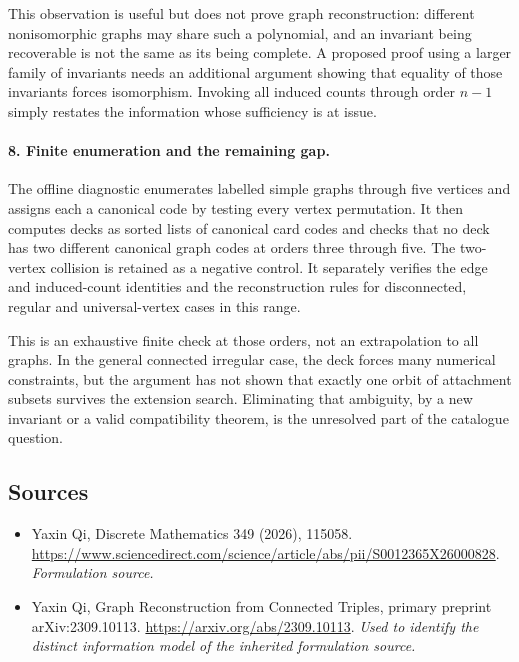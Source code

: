 \documentclass[11pt]{article}
\begin{document}
This observation is useful but does not prove graph reconstruction: different nonisomorphic graphs may share such a polynomial, and an invariant being recoverable is not the same as its being complete. A proposed proof using a larger family of invariants needs an additional argument showing that equality of those invariants forces isomorphism. Invoking all induced counts through order $n-1$ simply restates the information whose sufficiency is at issue.

\paragraph{8. Finite enumeration and the remaining gap.}
The offline diagnostic enumerates labelled simple graphs through five vertices and assigns each a canonical code by testing every vertex permutation. It then computes decks as sorted lists of canonical card codes and checks that no deck has two different canonical graph codes at orders three through five. The two-vertex collision is retained as a negative control. It separately verifies the edge and induced-count identities and the reconstruction rules for disconnected, regular and universal-vertex cases in this range.

This is an exhaustive finite check at those orders, not an extrapolation to all graphs. In the general connected irregular case, the deck forces many numerical constraints, but the argument has not shown that exactly one orbit of attachment subsets survives the extension search. Eliminating that ambiguity, by a new invariant or a valid compatibility theorem, is the unresolved part of the catalogue question.

\subsection{Sources}
\begin{itemize}
\item[S1]Yaxin Qi, Discrete Mathematics 349 (2026), 115058.
\url{https://www.sciencedirect.com/science/article/abs/pii/S0012365X26000828}.
\textit{Formulation source.}
\item[E1]Yaxin Qi, Graph Reconstruction from Connected Triples, primary preprint arXiv:2309.10113.
\url{https://arxiv.org/abs/2309.10113}.
\textit{Used to identify the distinct information model of the inherited formulation source.}
\end{itemize}
\end{document}
